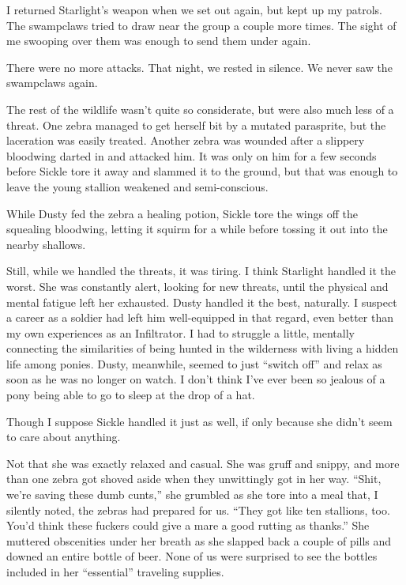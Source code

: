 I returned Starlight’s weapon when we set out again, but kept up my patrols. The swampclaws tried to draw near the group a couple more times. The sight of me swooping over them was enough to send them under again.

There were no more attacks. That night, we rested in silence. We never saw the swampclaws again.

The rest of the wildlife wasn’t quite so considerate, but were also much less of a threat. One zebra managed to get herself bit by a mutated parasprite, but the laceration was easily treated. Another zebra was wounded after a slippery bloodwing darted in and attacked him. It was only on him for a few seconds before Sickle tore it away and slammed it to the ground, but that was enough to leave the young stallion weakened and semi-conscious.

While Dusty fed the zebra a healing potion, Sickle tore the wings off the squealing bloodwing, letting it squirm for a while before tossing it out into the nearby shallows.

Still, while we handled the threats, it was tiring. I think Starlight handled it the worst. She was constantly alert, looking for new threats, until the physical and mental fatigue left her exhausted. Dusty handled it the best, naturally. I suspect a career as a soldier had left him well-equipped in that regard, even better than my own experiences as an Infiltrator. I had to struggle a little, mentally connecting the similarities of being hunted in the wilderness with living a hidden life among ponies. Dusty, meanwhile, seemed to just “switch off” and relax as soon as he was no longer on watch. I don’t think I’ve ever been so jealous of a pony being able to go to sleep at the drop of a hat.

Though I suppose Sickle handled it just as well, if only because she didn’t seem to care about anything.

Not that she was exactly relaxed and casual. She was gruff and snippy, and more than one zebra got shoved aside when they unwittingly got in her way. “Shit, we’re saving these dumb cunts,” she grumbled as she tore into a meal that, I silently noted, the zebras had prepared for us. “They got like ten stallions, too. You’d think these fuckers could give a mare a good rutting as thanks.” She muttered obscenities under her breath as she slapped back a couple of pills and downed an entire bottle of beer. None of us were surprised to see the bottles included in her “essential” traveling supplies.

